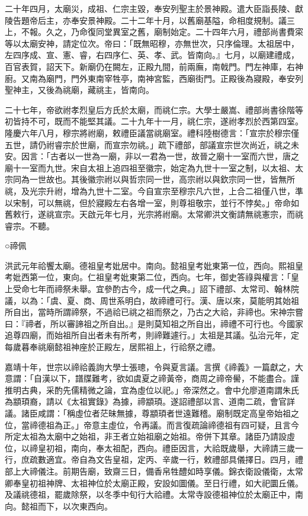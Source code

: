 二十年四月，太廟災，成祖、仁宗主毀，奉安列聖主於景神殿。遣大臣詣長陵、獻陵告題帝后主，亦奉安景神殿。二十二年十月，以舊廟基隘，命相度規制。議三上，不報。久之，乃命復同堂異室之舊，廟制始定。二十四年六月，禮部尚書費寀等以太廟安神，請定位次。帝曰：「既無昭穆，亦無世次，只序倫理。太祖居中，左四序成、宣、憲、睿，右四序仁、英、孝、武。皆南向。』七月，以廟建禮成，百官表賀，詔天下。新廟仍在闕左，正殿九間，前兩廡，南戟門。門左神庫，右神廚。又南為廟門，門外東南宰牲亭，南神宮監，西廟街門。正殿後為寢殿，奉安列聖神主，又後為祧廟，藏祧主，皆南向。

二十七年，帝欲祔孝烈皇后方氏於太廟，而祧仁宗。大學士嚴嵩、禮部尚書徐階等初皆持不可，既而不能堅其議。二十九年十一月，祧仁宗，遂祔孝烈於西第四室。隆慶六年八月，穆宗將祔廟，敕禮臣議當祧廟室。禮科陸樹德言：「宣宗於穆宗僅五世，請仍祔睿宗於世廟，而宣宗勿祧。」疏下禮部，部議宣宗世次尚近，祧之未安。因言：「古者以一世為一廟，非以一君為一世，故晉之廟十一室而六世，唐之廟十一室而九世。宋自太祖上追四祖至徽宗，始定為九世十一室之制，以太祖、太宗同為一世故也。其後徽宗祔以與哲宗同一世，高宗祔以與欽宗同一世，皆無所祧，及光宗升祔，增為九世十二室。今自宣宗至穆宗凡六世，上合二祖僅八世，準以宋制，可以無祧，但於寢殿左右各增一室，則尊祖敬宗，並行不悖矣。」帝命如舊敕行，遂祧宣宗。天啟元年七月，光宗將祔廟。太常卿洪文衡請無祧憲宗，而祧睿宗。不聽。

○禘佩

洪武元年祫饗太廟。德祖皇考妣居中。南向。懿祖皇考妣東第一位，西向。熙祖皇考妣西第一位，東向。仁祖皇考妣東第二位，西向。七年，御史答祿與權言：「皇上受命七年而禘祭未舉。宜參酌古今，成一代之典。」詔下禮部、太常司、翰林院議，以為：「虞、夏、商、周世系明白，故禘禮可行。漢、唐以來，莫能明其始祖所自出，當時所謂禘祭，不過祫已祧之祖而祭之，乃古之大祫，非禘也。宋神宗嘗曰：『禘者，所以審諦祖之所自出。』是則莫知祖之所自出，禘禮不可行也。今國家追尊四廟，而始祖所自出者未有所考，則禘難遽行。」太祖是其議。弘治元年，定每歲暮奉祧廟懿祖神座於正殿左，居熙祖上，行祫祭之禮。

嘉靖十年，世宗以禘祫義詢大學士張璁，令與夏言議。言撰《禘義》一篇獻之，大意謂：「自漢以下，譜牒難考，欲如虞夏之禘黃帝，商周之禘帝嚳，不能盡合。謹推明古典，采酌先儒精微之論，宜為虛位以祀。」帝深然之。會中允廖道南謂朱氏為顓頊裔，請以《太祖實錄》為據，禘顓頊。遂詔禮部以言、道南二疏，會官詳議。諸臣咸謂：「稱虛位者茫昧無據，尊顓頊者世遠難稽。廟制既定高皇帝始祖之位，當禘德祖為正。」帝意主虛位，令再議。而言復疏論禘德祖有四可疑，且言今所定太祖為太廟中之始祖，非王者立始祖廟之始祖。帝併下其章。諸臣乃請設虛位，以禘皇初祖，南向，奉太祖配，西向。禮臣因言，大祫既歲舉，大禘請三歲一行，庶疏數適宜。帝自為文告皇祖，定丙、辛歲一行，敕禮部具儀擇日。四月，禮部上大禘儀注。前期告廟，致齋三日，備香帛牲醴如時享儀。錦衣衛設儀衛，太常卿奉皇初祖神牌、太祖神位於太廟正殿，安設如圖儀。至日行禮，如大祀圜丘儀。及議祧德祖，罷歲除祭，以冬季中旬行大祫禮。太常寺設德祖神位於太廟正中，南向。懿祖而下，以次東西向。

